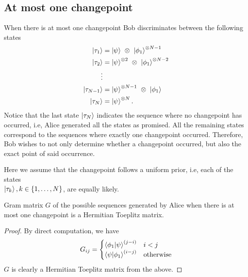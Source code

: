 
\subsection{At most one changepoint}\label{sec:ch3_QSD-1CP}

When there is at most one changepoint Bob discriminates between the following states
\begin{equation}
    \begin{aligned}
        \ket{\tau_1} &= \ket{\psi}\ \otimes\ \ket{\phi_1}^{\otimes N-1} \\
        \ket{\tau_2} &= \ket{\psi}^{\otimes 2}\ \otimes\ \ket{\phi_1}^{\otimes N-2} \\
        \vdots \\
        \ket{\tau_{N-1}} &= \ket{\psi}^{\otimes N-1}\ \otimes\ \ket{\phi_1} \\
        \ket{\tau_N} &= \ket{\psi}^{\otimes N}. 
    \end{aligned}
\end{equation}
Notice that the last state $\ket{\tau_N}$ indicates the sequence where no changepoint has occurred, i.e, Alice generated all the states as promised.
All the remaining states correspond to the sequences where exactly one changepoint occurred.
Therefore, Bob wishes to not only determine whether a changepoint occurred, but also the exact point of said occurrence.

Here we assume that the changepoint follows a uniform prior, i.e, each of the states \\
$\ket{\tau_k}, k \in \{1, \dots, N\}$, are equally likely.

\begin{lemma}
    \label{lem:ch3_QSD-G_sym_toep}
    Gram matrix $G$ of the possible sequences generated by Alice when there is at most one changepoint is a Hermitian Toeplitz matrix.
\end{lemma}
\begin{proof}
    By direct computation, we have
    \begin{align*}
        G_{ij} = 
        \begin{cases}
            \braket{\phi_1}{\psi}^{(j-i)} &i < j \\
            \braket{\psi}{\phi_1}^{(i-j)} &\text{otherwise}
        \end{cases}
    \end{align*}
    $G$ is clearly a Hermitian Toeplitz matrix from the above.
\end{proof}

